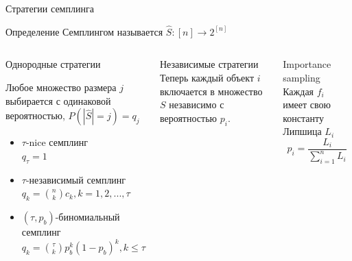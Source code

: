 \documentclass{beamer}
\begin{document}
\begin{frame}{Стратегии семплинга}
	
	\begin{block}{Определение}
		Семплингом называется $\hat S: [n] \rightarrow 2^{[n]}$ 
	\end{block}
	
\begin{columns}[c]
    \begin{block}{Однородные стратегии}
    	
    	Любое множество размера $j$ выбирается с одинаковой вероятностью, $P(|\hat S| = j) = q_j$
    	
    	\begin{itemize}
    		\item $\tau$-nice семплинг \\
    		$ q_\tau = 1 $
    		\item $\tau$-независимый семплинг \\
    		$ q_k = \binom{n}{k}c_k, k = 1, 2, ..., \tau $
    		\item $(\tau, p_b)$-биномиальный семплинг \\
    		$ q_k = \binom{\tau}{k}p_b^k(1 - p_b)^k, k \leqslant \tau $
    	\end{itemize}
    \end{block}
	\begin{block}{Независимые стратегии}
		Теперь каждый объект $i$ включается в множество $S$ независимо с вероятностью $p_i$.
	\end{block}
    \begin{block}{Importance sampling}
    	Каждая $f_i$ имеет свою константу Липшица $L_i$
    	$$p_i = \frac{L_i}{\sum \limits_{i=1}^n L_i}$$
    \end{block}
\end{columns}

\end{frame}
\end{document}
